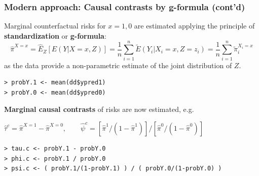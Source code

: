 \documentclass[12pt,dvipsnames,t,aspectratio=169, handout%
]{beamer}
\begin{document}
\begin{frame}[fragile]
\frametitle{\large Modern approach: Causal contrasts by g-formula (cont'd)}
\bi
\item
Marginal counterfactual risks for $x=1,0$ are estimated applying
the principle of {\bf standardization} or {\bf g-formula}:
$$ \widehat{\pi}^{X=x} = \widehat{E}_Z[E(Y|X=x, Z)]  = \frac{1}{n} \sum_{i=1}^n \widetilde{E}(Y_i|X_i=x, Z=z_i) 
= \frac{1}{n} \sum_{i=1}^n \widetilde{\pi}_i^{X_i=x}
$$
as the data provide a non-parametric estimate of the joint distribution of $Z$.
\pause
{\small\color{blue}
\begin{verbatim}
> probY.1 <- mean(dd$ypred1)
> probY.0 <- mean(dd$ypred0)
\end{verbatim}
}
\medskip
\item
\textbf{Marginal causal contrasts} of risks are now estimated, e.g.
\begin{center}
$ \widehat\tau^c = \widehat{\pi}^{X=1} - \widehat{\pi}^{X=0}, \qquad 
	 \widehat\psi^c = [ \widehat{\pi}^{1}/(1-  \widehat{\pi}^{1})]/ [ \widehat{\pi}^{0}/(1- \widehat{\pi}^{0})] $
\end{center}
\medskip
{\small\color{blue}
\begin{verbatim}
> tau.c <- probY.1 - probY.0
> phi.c <- probY.1 / probY.0
> psi.c <- ( probY.1/(1-probY.1) ) / ( probY.0/(1-probY.0) )  
\end{verbatim}
}

\ei
\end{frame}
\end{document}
